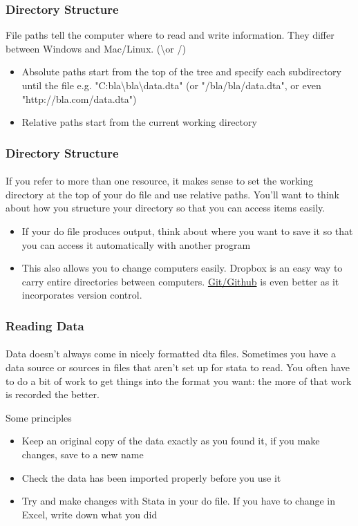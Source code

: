 \documentclass{beamer}
\begin{document}
\begin{frame}
  \frametitle{Directory Structure}
  File paths tell the computer where to read and write information. They differ between Windows and Mac/Linux. (\textbackslash or /)
  \begin{itemize}
    \item Absolute paths start from the top of the tree and specify each subdirectory until the file e.g. "C:bla\textbackslash bla\textbackslash data.dta" (or "/bla/bla/data.dta", or even "http://bla.com/data.dta")
    \item Relative paths start from the current working directory
  \end{itemize}
\end{frame}

\begin{frame}
  \frametitle{Directory Structure}
  \framesubtitle{}
  If you refer to more than one resource, it makes sense to set the working directory at the top of your do file and use relative paths. You'll want to think about how you structure your directory so that you can access items easily.
  \begin{itemize}
    \item If your do file produces output, think about where you want to save it so that you can access it automatically with another program
    \item This also allows you to change computers easily. Dropbox is an easy way to carry entire directories between computers. \href{https://desktop.github.com/}{Git/Github} is even better as it incorporates version control.
  \end{itemize}
\end{frame}

\begin{frame}
  \frametitle{Reading Data}
  \framesubtitle{}
Data doesn't always come in nicely formatted dta files. Sometimes you have a data source or sources in files that aren't set up for stata to read. You often have to do a bit of work to get things into the format you want: the more of that work is recorded the better.

Some principles
  \begin{itemize}
    \item Keep an original copy of the data exactly as you found it, if you make changes, save to a new name
    \item Check the data has been imported properly before you use it
    \item Try and make changes with Stata in your do file. If you have to change in Excel, write down what you did
  \end{itemize}
\end{frame}
\end{document}
